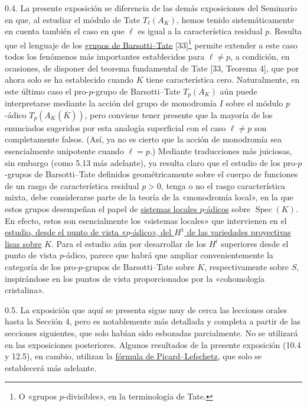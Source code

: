 0.4. La presente exposición se diferencia de las demás exposiciones
del Seminario en que, al estudiar el módulo de Tate $T_\ell(A_K)$,
hemos tenido sistemáticamente en cuenta también el caso en que $\ell$
es igual a la característica residual $p$. Resulta que el lenguaje de
los \underline{grupos de Barsotti--Tate} [33]\footnote{O «grupos
$p$-divisibles», en la terminología de Tate.} permite extender a este
caso todos los fenómenos más importantes establecidos para
$\ell\ne p$, a condición, en ocasiones, de disponer del teorema
fundamental de Tate [33, Teorema 4], que por ahora solo se ha establecido
cuando $K$ tiene característica cero. Naturalmente, en este último
caso el pro-$p$-grupo de Barsotti--Tate $T_p(A_K)$ aún puede
interpretarse mediante la acción del grupo de monodromía $I$ sobre el
módulo $p$-ádico $T_p(A_K(\overline K))$, pero conviene tener presente
que la mayoría de los enunciados sugeridos por esta analogía superficial
con el caso $\ell\ne p$ son completamente falsos. (Así, ya no es cierto
que la acción de monodromía sea esencialmente unipotente cuando
$\ell=p$.) Mediante traducciones más juiciosas, sin embargo (como 5.13
más adelante), ya resulta claro que el estudio de los pro-$p$-grupos de
Barsotti--Tate definidos geométricamente sobre el cuerpo de funciones de
un rasgo de característica residual $p>0$, tenga o no el rasgo
característica mixta, debe considerarse parte de la teoría de la
«monodromía local», en la que estos grupos desempeñan el papel de
\underline{sistemas locales $p$-ádicos} sobre
$\operatorname{Spec}(K)$. En efecto, estos son esencialmente los
«sistemas locales» que intervienen en el \underline{estudio, desde el
punto de vista «$p$-ádico», del $H^1$ de las variedades proyectivas
lisas sobre} $K$. Para el estudio aún por desarrollar de los $H^i$
superiores desde el punto de vista $p$-ádico, parece que habrá que
ampliar convenientemente la categoría de los pro-$p$-grupos de
Barsotti--Tate sobre $K$, respectivamente sobre $S$, inspirándose en
los puntos de vista proporcionados por la «cohomología cristalina».

0.5. La exposición que aquí se presenta sigue muy de cerca las
lecciones orales hasta la Sección 4, pero es notablemente más detallada
y completa a partir de las secciones siguientes, que solo habían sido
esbozadas parcialmente. No se utilizará en las exposiciones posteriores.
Algunos resultados de la presente exposición (10.4 y 12.5), en cambio,
utilizan la \underline{fórmula de Picard--Lefschetz}, que solo se
establecerá más adelante.


